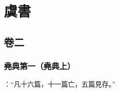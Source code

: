 

\part{虞書}

\chapter{卷二}

\section{堯典第一（堯典上）}

 {\noindent\zhu{}\fzbyks {}：“凡十六篇，十一篇亡，五篇見存。” \par}

